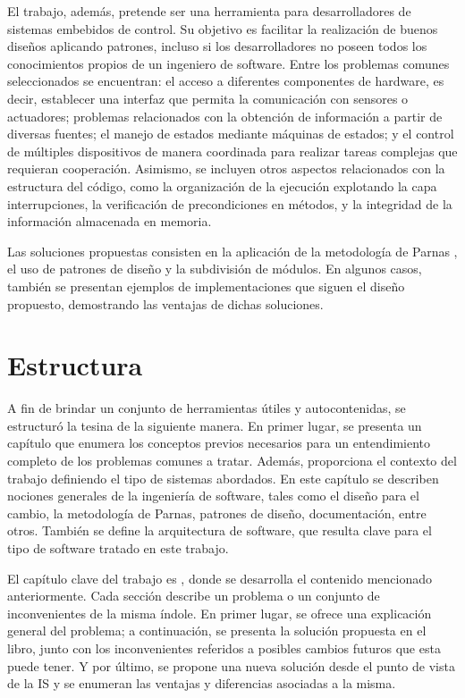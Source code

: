 El trabajo, además, pretende ser una herramienta para desarrolladores de sistemas embebidos de control. Su objetivo es facilitar la realización de buenos diseños aplicando patrones, incluso si los desarrolladores no poseen todos los conocimientos propios de un ingeniero de software. Entre los problemas comunes seleccionados se encuentran: el acceso a diferentes componentes de hardware, es decir, establecer una interfaz que permita la comunicación con sensores o actuadores; problemas relacionados con la obtención de información a partir de diversas fuentes; el manejo de estados mediante máquinas de estados; y el control de múltiples dispositivos de manera coordinada para realizar tareas complejas que requieran cooperación. Asimismo, se incluyen otros aspectos relacionados con la estructura del código, como la organización de la ejecución explotando la capa interrupciones, la verificación de precondiciones en métodos, y la integridad de la información almacenada en memoria.

Las soluciones propuestas consisten en la aplicación de la metodología de Parnas \cite{parnas72}, el uso de patrones de diseño y la subdivisión de módulos. En algunos casos, también se presentan ejemplos de implementaciones que siguen el diseño propuesto, demostrando las ventajas de dichas soluciones.

\section*{Estructura}

A fin de brindar un conjunto de herramientas útiles y autocontenidas, se estructuró la tesina de la siguiente manera. En primer lugar, se presenta un capítulo que enumera los conceptos previos necesarios para un entendimiento completo de los problemas comunes a tratar. Además, proporciona el contexto del trabajo definiendo el tipo de sistemas abordados. En este capítulo se describen nociones generales de la ingeniería de software, tales como el diseño para el cambio, la metodología de Parnas, patrones de diseño, documentación, entre otros. También se define la arquitectura de software, que resulta clave para el tipo de software tratado en este trabajo.

El capítulo clave del trabajo es , donde se desarrolla el contenido mencionado anteriormente. Cada sección describe un problema o un conjunto de inconvenientes de la misma índole. En primer lugar, se ofrece una explicación general del problema; a continuación, se presenta la solución propuesta en el libro, junto con los inconvenientes referidos a posibles cambios futuros que esta puede tener. Y por último, se propone una nueva solución desde el punto de vista de la IS y se enumeran las ventajas y diferencias asociadas a la misma.



